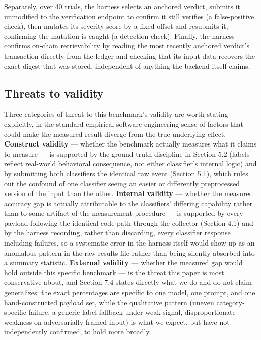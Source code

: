 \documentclass[journal,10pt,twocolumn]{IEEEtran}
\begin{document}
Separately, over 40 trials, the harness selects an anchored verdict, submits it unmodified to the verification endpoint to confirm it still verifies (a false-positive check), then mutates its severity score by a fixed offset and resubmits it, confirming the mutation is caught (a detection check). Finally, the harness confirms on-chain retrievability by reading the most recently anchored verdict's transaction directly from the ledger and checking that its input data recovers the exact digest that was stored, independent of anything the backend itself claims.

\subsection{Threats to validity}

Three categories of threat to this benchmark's validity are worth stating explicitly, in the standard empirical-software-engineering sense of factors that could make the measured result diverge from the true underlying effect. \textbf{Construct validity} --- whether the benchmark actually measures what it claims to measure --- is supported by the ground-truth discipline in Section 5.2 (labels reflect real-world behavioral consequence, not either classifier's internal logic) and by submitting both classifiers the identical raw event (Section 5.1), which rules out the confound of one classifier seeing an easier or differently preprocessed version of the input than the other. \textbf{Internal validity} --- whether the measured accuracy gap is actually attributable to the classifiers' differing capability rather than to some artifact of the measurement procedure --- is supported by every payload following the identical code path through the collector (Section 4.1) and by the harness recording, rather than discarding, every classifier response including failures, so a systematic error in the harness itself would show up as an anomalous pattern in the raw results file rather than being silently absorbed into a summary statistic. \textbf{External validity} --- whether the measured gap would hold outside this specific benchmark --- is the threat this paper is most conservative about, and Section 7.4 states directly what we do and do not claim generalizes: the exact percentages are specific to one model, one prompt, and one hand-constructed payload set, while the qualitative pattern (uneven category-specific failure, a generic-label fallback under weak signal, disproportionate weakness on adversarially framed input) is what we expect, but have not independently confirmed, to hold more broadly.
\end{document}
